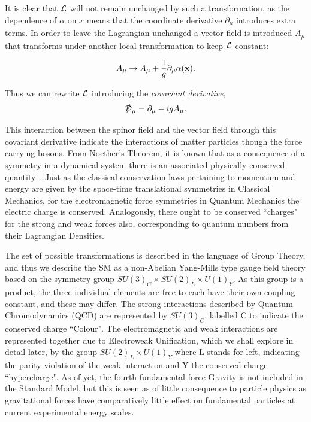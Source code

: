 It is clear that ${\mathcal{L}}$ will not remain unchanged by such a transformation, as the dependence of $\alpha$ on $x$ means that the coordinate derivative $\partial_{\mu}$ introduces extra terms. In order to leave the Lagrangian unchanged a vector field is introduced $A_{\mu}$ that transforms under another local transformation to keep ${\mathcal{L}}$ constant: 

\begin{equation}
A_{\mu} \rightarrow A_{\mu} + \frac{1}{g} \partial_{\mu} \alpha(\mathbf{x}).
\label{ATrans}
\end{equation}

Thus we can rewrite ${\mathcal{L}}$ introducing the \textit{covariant derivative}, 
\begin{equation}
\slashed{\Dev}_{\mu} = \partial_{\mu} - igA_{\mu}. 
\end{equation}

This interaction between the spinor field and the vector field through this covariant derivative indicate the interactions of matter particles though the force carrying bosons. From Noether's Theorem, it is known that as a consequence of a symmetry in a dynamical system there is an associated physically conserved quantity~\cite{Rolnick}. Just as the classical conservation laws pertaining to momentum and energy are given by the space-time translational symmetries in Classical Mechanics, for the electromagnetic force symmetries in Quantum Mechanics the electric charge is conserved. Analogously, there ought to be conserved ``charges" for the strong and weak forces also, corresponding to quantum numbers from their Lagrangian Densities. 
 
The set of possible transformations is described in the language of Group Theory, and thus we describe the SM as a non-Abelian Yang-Mills type gauge field theory based on the symmetry group $SU(3)_{C} \times SU(2)_{L} \times U(1)_{Y}$. As this group is a product, the three individual elements are free to each have their own coupling constant, and these may differ. The strong interactions described by Quantum Chromodynamics (QCD) are represented by $SU(3)_{C}$, labelled C to indicate the conserved charge ``Colour". The electromagnetic and weak interactions are represented together due to Electroweak Unification, which we shall explore in detail later, by the group $SU(2)_L \times U(1)_{Y}$ where L stands for left, indicating the parity violation of the weak interaction and Y the conserved charge ``hypercharge". As of yet, the fourth fundamental force Gravity is not included in the Standard Model, but this is seen as of little consequence to particle physics as gravitational forces have comparatively little effect on fundamental particles at current experimental energy scales. 

